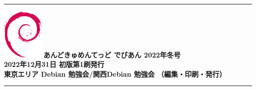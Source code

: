 \documentclass[mingoth,a4paper]{jsarticle}
\begin{document}
\vspace*{16cm}
{\color{dancerlightblue}\rule{\hsize}{1mm}}
\vspace{2mm}
\includegraphics[width=2cm]{image200502/openlogo-nd.eps}
\noindent \Large \bf あんどきゅめんてっど でびあん 2022年冬号\\
\noindent \normalfont 2022年12月31日 \hspace{5mm}  初版第1刷発行\\
\noindent \normalfont 東京エリア Debian 勉強会/関西Debian 勉強会 （編集・印刷・発行）\\
{\color{dancerdarkblue}\rule{\hsize}{1mm}}
\end{document}
